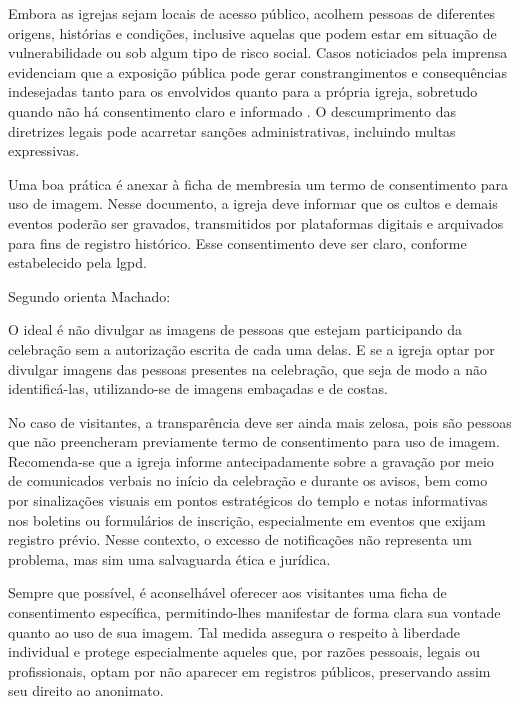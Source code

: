Embora as igrejas sejam locais de acesso público, acolhem pessoas de diferentes origens, histórias e condições, inclusive aquelas que podem estar em situação de vulnerabilidade ou sob algum tipo de risco social. Casos noticiados pela imprensa evidenciam que a exposição pública pode gerar constrangimentos e consequências indesejadas tanto para os envolvidos quanto para a própria igreja, sobretudo quando não há consentimento claro e informado \cite{silva2023}. O descumprimento das diretrizes legais pode acarretar sanções administrativas, incluindo multas expressivas.

Uma boa prática é anexar à ficha de membresia um termo de consentimento para uso de imagem. Nesse documento, a igreja deve informar que os cultos e demais eventos poderão ser gravados, transmitidos por plataformas digitais e arquivados para fins de registro histórico. Esse consentimento deve ser claro, conforme estabelecido pela \gls{lgpd}.

Segundo orienta Machado:

\begin{citacao}
    O ideal é não divulgar as imagens de pessoas que estejam participando da celebração sem a autorização escrita de cada uma delas. E se a igreja optar por divulgar imagens das pessoas presentes na celebração, que seja de modo a não identificá-las, utilizando-se de imagens embaçadas e de costas. \cite[p.~12]{machado2020}
\end{citacao}

No caso de visitantes, a transparência deve ser ainda mais zelosa, pois são pessoas que não preencheram previamente termo de consentimento para uso de imagem. Recomenda-se que a igreja informe antecipadamente sobre a gravação por meio de comunicados verbais no início da celebração e durante os avisos, bem como por sinalizações visuais em pontos estratégicos do templo e notas informativas nos boletins ou formulários de inscrição, especialmente em eventos que exijam registro prévio. Nesse contexto, o excesso de notificações não representa um problema, mas sim uma salvaguarda ética e jurídica.

Sempre que possível, é aconselhável oferecer aos visitantes uma ficha de consentimento específica, permitindo-lhes manifestar de forma clara sua vontade quanto ao uso de sua imagem. Tal medida assegura o respeito à liberdade individual e protege especialmente aqueles que, por razões pessoais, legais ou profissionais, optam por não aparecer em registros públicos, preservando assim seu direito ao anonimato.


